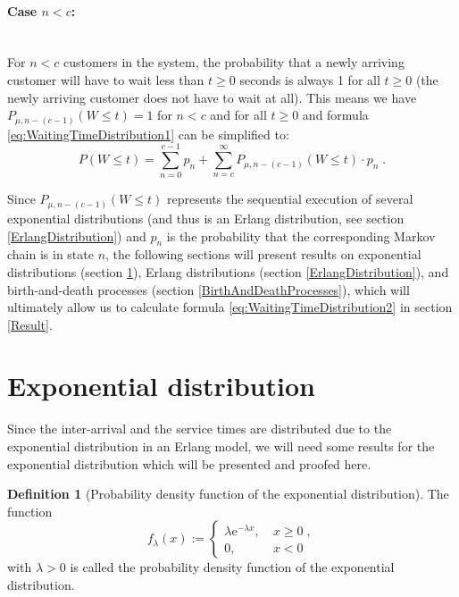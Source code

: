 \documentclass[a4paper,11pt,oneside]{article}
\theoremstyle{definition}
\newtheorem{definition}{Definition}
\begin{document}
\paragraph{Case $n<c$:}~\\
For $n<c$ customers in the system, the probability that a newly arriving customer will have to wait less than $t\ge0$ seconds is always 1 for all $t\ge0$ (the newly arriving customer does not have to wait at all). This means we have $P_{\mu,n-(c-1)}(W\le t)=1$ for $n<c$ and for all $t\ge0$ and formula \eqref{eq:WaitingTimeDistribution1} can be simplified to:
\begin{equation}\label{eq:WaitingTimeDistribution2}
P(W\le t)=\sum_{n=0}^{c-1} p_n+\sum_{n=c}^\infty P_{\mu,n-(c-1)}(W\le t)\cdot p_n\;.
\end{equation}

Since $P_{\mu,n-(c-1)} (W\le t)$ represents the sequential execution of several exponential distributions (and thus is an Erlang distribution, see section \ref{ErlangDistribution}) and $p_n$ is the probability that the corresponding Markov chain is in state $n$, the following sections will present results on exponential distributions (section \ref{ExponentialDistribution}), Erlang distributions (section \ref{ErlangDistribution}), and birth-and-death processes (section \ref{BirthAndDeathProcesses}), which will ultimately allow us to calculate formula \eqref{eq:WaitingTimeDistribution2} in section \ref{Result}.



\section{Exponential distribution}\label{ExponentialDistribution}

Since the inter-arrival and the service times are distributed due to the exponential distribution in an Erlang model, we will need some results for the exponential distribution which will be presented and proofed here.

\begin{definition}[Probability density function of the exponential distribution]
The function
$$
f_{\lambda}(x):=\left\{\begin{matrix}
\lambda \mathrm{e}^{-\lambda x},&~x\ge0\;,\\
0,&~x<0
\end{matrix}\right.
$$
with $\lambda>0$ is called the probability density function of the exponential distribution.
\end{definition}
\end{document}
